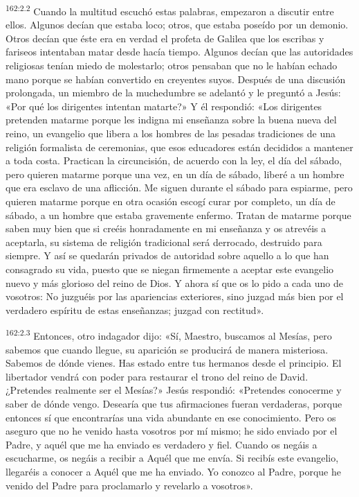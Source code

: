 \par 
\textsuperscript{162:2.2} Cuando la multitud escuchó estas palabras, empezaron a discutir entre ellos. Algunos decían que estaba loco; otros, que estaba poseído por un demonio. Otros decían que éste era en verdad el profeta de Galilea que los escribas y fariseos intentaban matar desde hacía tiempo. Algunos decían que las autoridades religiosas tenían miedo de molestarlo; otros pensaban que no le habían echado mano porque se habían convertido en creyentes suyos. Después de una discusión prolongada, un miembro de la muchedumbre se adelantó y le preguntó a Jesús: «Por qué los dirigentes intentan matarte?» Y él respondió: «Los dirigentes pretenden matarme porque les indigna mi enseñanza sobre la buena nueva del reino, un evangelio que libera a los hombres de las pesadas tradiciones de una religión formalista de ceremonias, que esos educadores están decididos a mantener a toda costa. Practican la circuncisión, de acuerdo con la ley, el día del sábado, pero quieren matarme porque una vez, en un día de sábado, liberé a un hombre que era esclavo de una aflicción. Me siguen durante el sábado para espiarme, pero quieren matarme porque en otra ocasión escogí curar por completo, un día de sábado, a un hombre que estaba gravemente enfermo. Tratan de matarme porque saben muy bien que si creéis honradamente en mi enseñanza y os atrevéis a aceptarla, su sistema de religión tradicional será derrocado, destruido para siempre. Y así se quedarán privados de autoridad sobre aquello a lo que han consagrado su vida, puesto que se niegan firmemente a aceptar este evangelio nuevo y más glorioso del reino de Dios. Y ahora sí que os lo pido a cada uno de vosotros: No juzguéis por las apariencias exteriores, sino juzgad más bien por el verdadero espíritu de estas enseñanzas; juzgad con rectitud».

\par 
\textsuperscript{162:2.3} Entonces, otro indagador dijo: «Sí, Maestro, buscamos al Mesías, pero sabemos que cuando llegue, su aparición se producirá de manera misteriosa. Sabemos de dónde vienes. Has estado entre tus hermanos desde el principio. El libertador vendrá con poder para restaurar el trono del reino de David. ¿Pretendes realmente ser el Mesías?» Jesús respondió: «Pretendes conocerme y saber de dónde vengo. Desearía que tus afirmaciones fueran verdaderas, porque entonces sí que encontrarías una vida abundante en ese conocimiento. Pero os aseguro que no he venido hasta vosotros por mí mismo; he sido enviado por el Padre, y aquél que me ha enviado es verdadero y fiel. Cuando os negáis a escucharme, os negáis a recibir a Aquél que me envía. Si recibís este evangelio, llegaréis a conocer a Aquél que me ha enviado. Yo conozco al Padre, porque he venido del Padre para proclamarlo y revelarlo a vosotros».

